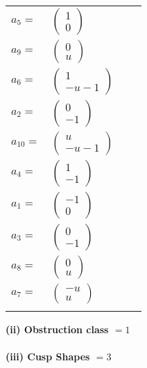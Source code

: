 \documentclass[1p]{elsarticle_modified}
\theoremstyle{definition}
\begin{document}
\begin{tabular}{m{7pt} m{180pt} m{7pt} m{180pt} }
\flushright $a_{5}=$&$\begin{pmatrix}1\\0\end{pmatrix}$ \\
\flushright $a_{9}=$&$\begin{pmatrix}0\\u\end{pmatrix}$ \\
\flushright $a_{6}=$&$\begin{pmatrix}1\\- u-1\end{pmatrix}$ \\
\flushright $a_{2}=$&$\begin{pmatrix}0\\-1\end{pmatrix}$ \\
\flushright $a_{10}=$&$\begin{pmatrix}u\\- u-1\end{pmatrix}$ \\
\flushright $a_{4}=$&$\begin{pmatrix}1\\-1\end{pmatrix}$ \\
\flushright $a_{1}=$&$\begin{pmatrix}-1\\0\end{pmatrix}$ \\
\flushright $a_{3}=$&$\begin{pmatrix}0\\-1\end{pmatrix}$ \\
\flushright $a_{8}=$&$\begin{pmatrix}0\\u\end{pmatrix}$ \\
\flushright $a_{7}=$&$\begin{pmatrix}- u\\u\end{pmatrix}$\\&\end{tabular}
\flushleft \textbf{(ii) Obstruction class $= 1$}\\~\\
\flushleft \textbf{(iii) Cusp Shapes $= 3$}\\~\\
\end{document}
